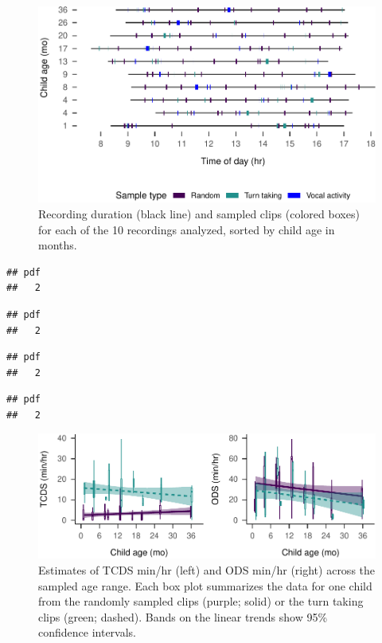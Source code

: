 \documentclass[,man,floatsintext]{apa6}
\begin{document}
\begin{figure}
\centering
\includegraphics{Yeli-CLE_files/figure-latex/fig2-1.pdf}
\caption{\label{fig:fig2}Recording duration (black line) and sampled clips
(colored boxes) for each of the 10 recordings analyzed, sorted by child
age in months.}
\end{figure}

\begin{verbatim}
## pdf 
##   2
\end{verbatim}

\begin{verbatim}
## pdf 
##   2
\end{verbatim}

\begin{verbatim}
## pdf 
##   2
\end{verbatim}

\begin{verbatim}
## pdf 
##   2
\end{verbatim}

\begin{figure}
\centering
\includegraphics{Yeli-CLE_files/figure-latex/fig3-1.pdf}
\caption{\label{fig:fig3}Estimates of TCDS min/hr (left) and ODS min/hr
(right) across the sampled age range. Each box plot summarizes the data
for one child from the randomly sampled clips (purple; solid) or the
turn taking clips (green; dashed). Bands on the linear trends show 95\%
confidence intervals.}
\end{figure}
\end{document}
